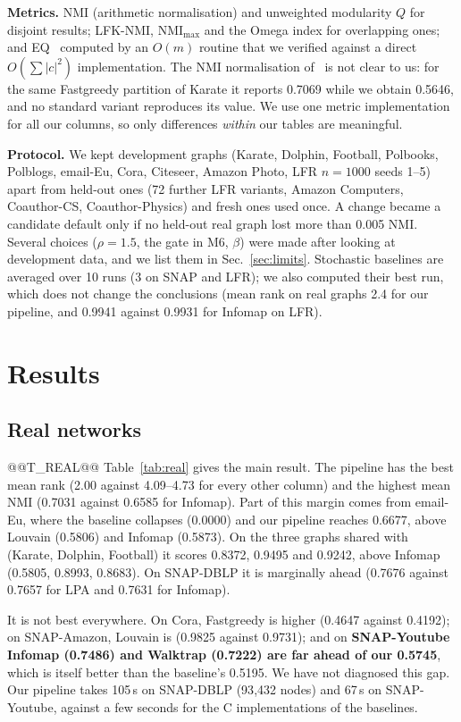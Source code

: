 \documentclass[conference]{IEEEtran}
\begin{document}
\textbf{Metrics.} NMI (arithmetic normalisation) and unweighted modularity $Q$ for disjoint results; LFK-NMI, $\mathrm{NMI}_{\max}$ and the Omega index for overlapping ones; and EQ~\cite{kong2026} computed by an $O(m)$ routine that we verified against a direct $O(\sum|c|^2)$ implementation. The NMI normalisation of~\cite{kong2026} is not clear to us: for the same Fastgreedy partition of Karate it reports 0.7069 while we obtain 0.5646, and no standard variant reproduces its value. We use one metric implementation for all our columns, so only differences \emph{within} our tables are meaningful.

\textbf{Protocol.} We kept development graphs (Karate, Dolphin, Football, Polbooks, Polblogs, email-Eu, Cora, Citeseer, Amazon Photo, LFR $n{=}1000$ seeds 1--5) apart from held-out ones (72 further LFR variants, Amazon Computers, Coauthor-CS, Coauthor-Physics) and fresh ones used once. A change became a candidate default only if no held-out real graph lost more than 0.005 NMI. Several choices ($\rho{=}1.5$, the gate in M6, $\beta$) were made after looking at development data, and we list them in Sec.~\ref{sec:limits}. Stochastic baselines are averaged over 10 runs (3 on SNAP and LFR); we also computed their best run, which does not change the conclusions (mean rank on real graphs 2.4 for our pipeline, and 0.9941 against 0.9931 for Infomap on LFR).

\section{Results}\label{sec:results}
\subsection{Real networks}
@@T_REAL@@
Table~\ref{tab:real} gives the main result. The pipeline has the best mean rank (2.00 against 4.09--4.73 for every other column) and the highest mean NMI (0.7031 against 0.6585 for Infomap). Part of this margin comes from email-Eu, where the baseline collapses (0.0000) and our pipeline reaches 0.6677, above Louvain (0.5806) and Infomap (0.5873). On the three graphs shared with~\cite{kong2026} (Karate, Dolphin, Football) it scores 0.8372, 0.9495 and 0.9242, above Infomap (0.5805, 0.8993, 0.8683). On SNAP-DBLP it is marginally ahead (0.7676 against 0.7657 for LPA and 0.7631 for Infomap).

It is not best everywhere. On Cora, Fastgreedy is higher (0.4647 against 0.4192); on SNAP-Amazon, Louvain is (0.9825 against 0.9731); and on \textbf{SNAP-Youtube Infomap (0.7486) and Walktrap (0.7222) are far ahead of our 0.5745}, which is itself better than the baseline's 0.5195. We have not diagnosed this gap. Our pipeline takes 105\,s on SNAP-DBLP (93{,}432 nodes) and 67\,s on SNAP-Youtube, against a few seconds for the C implementations of the baselines.
\end{document}
